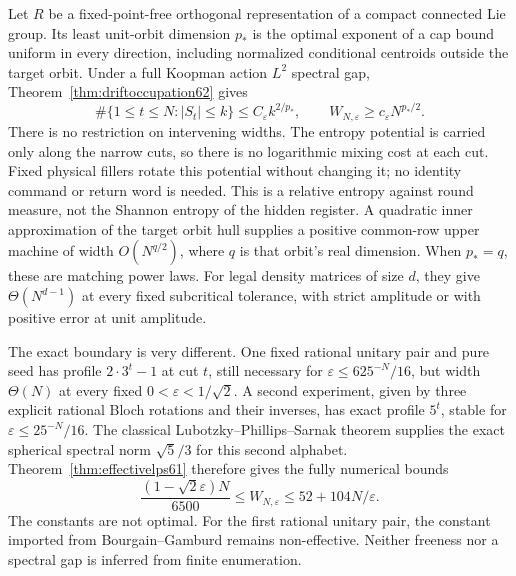 Let $R$ be a fixed-point-free orthogonal representation of a compact
connected Lie group. Its least unit-orbit dimension $p_*$ is the optimal
exponent of a cap bound uniform in every direction, including normalized
conditional centroids outside the target orbit. Under a full Koopman action $L^2$ spectral
gap, Theorem~\ref{thm:driftoccupation62}
gives
\[
 \#\{1\le t\le N:|S_t|\le k\}\le C_\varepsilon k^{2/p_*},
 \qquad W_{N,\varepsilon}\ge c_\varepsilon N^{p_*/2}.
\]
There is no restriction on intervening widths. The entropy potential
is carried only along the narrow cuts, so there is no logarithmic
mixing cost at each cut. Fixed physical fillers rotate this potential
without changing it; no identity command or return word is needed.
This is a relative entropy against round measure, not the Shannon
entropy of the hidden register. A quadratic inner approximation of the target
orbit hull supplies a positive common-row upper machine of width
$O(N^{q/2})$, where $q$ is that orbit's real dimension. When $p_*=q$,
these are matching power laws. For legal density matrices of size $d$,
they give $\Theta(N^{d-1})$ at every fixed subcritical tolerance, with
strict amplitude or with positive error at unit amplitude.

The exact boundary is very different. One fixed rational unitary pair
and pure seed has profile $2\cdot3^t-1$ at cut $t$, still necessary for
$\varepsilon\le625^{-N}/16$, but width $\Theta(N)$ at every fixed
$0<\varepsilon<1/\sqrt2$. A second experiment, given by three explicit
rational Bloch rotations and their inverses, has exact profile $5^t$,
stable for $\varepsilon\le25^{-N}/16$. The classical
Lubotzky--Phillips--Sarnak theorem supplies the exact spherical spectral
norm $\sqrt5/3$ for this second alphabet. Theorem~\ref{thm:effectivelps61}
therefore gives the fully numerical bounds
\[
 \frac{(1-\sqrt2\varepsilon)N}{6500}
 \le W_{N,\varepsilon}\le52+104N/\varepsilon.
\]
The constants are not optimal. For the first rational unitary pair, the
constant imported from Bourgain--Gamburd remains non-effective. Neither
freeness nor a spectral gap is inferred from finite enumeration.

